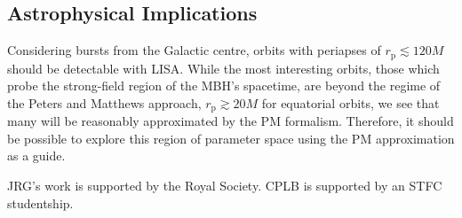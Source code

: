 \documentclass[aps,prd,amsfonts,amssymb,amsmath,reprint,showpacs,groupedaddress]{revtex4-1}
\newcommand{\sub}[1]{\ensuremath{_\text{#1}}}
\begin{document}
\subsection{Astrophysical Implications}

Considering bursts from the Galactic centre, orbits with periapses of $r\sub{p} \lesssim 120 M$ should be detectable with LISA\cite{Rubbo2006, Hopman2007}. While the most interesting orbits, those which probe the strong-field region of the MBH's spacetime, are beyond the regime of the Peters and Matthews approach, $r\sub{p} \gtrsim 20 M$ for equatorial orbits, we see that many will be reasonably approximated by the PM formalism. Therefore, it should be possible to explore this region of parameter space using the PM approximation as a guide.

\begin{acknowledgments}
JRG's work is supported by the Royal Society. CPLB is supported by an STFC studentship.
\end{acknowledgments}


\end{document}
